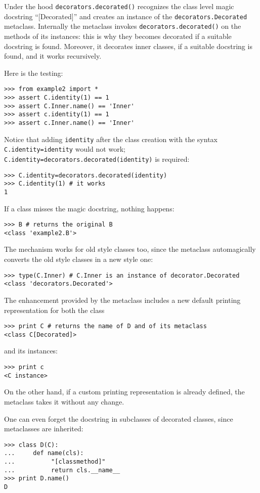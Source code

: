 \documentclass[11pt,english]{article}
\begin{document}
Under the hood \texttt{decorators.decorated()} recognizes the class level
magic docstring ``[Decorated]'' and creates an instance of the 
\texttt{decorators.Decorated} metaclass.
Internally the metaclass invokes \texttt{decorators.decorated()}
on the methods of its instances: this is why they becomes decorated
if a suitable docstring is found. Moreover, it decorates inner classes,
if a suitable docstring is found, and it works recursively.

Here is the testing:
\begin{verbatim}>>> from example2 import *
>>> assert C.identity(1) == 1
>>> assert C.Inner.name() == 'Inner'
>>> assert c.identity(1) == 1 
>>> assert c.Inner.name() == 'Inner' \end{verbatim}

Notice that adding \texttt{identity} after the class creation with the syntax 
\texttt{C.identity=identity} would not work; 
\texttt{C.identity=decorators.decorated(identity)} is required:
\begin{verbatim}>>> C.identity=decorators.decorated(identity)
>>> C.identity(1) # it works
1\end{verbatim}

If a class misses the magic docstring, nothing happens:
\begin{verbatim}>>> B # returns the original B
<class 'example2.B'>\end{verbatim}

The mechanism works for old style classes too,
since the metaclass automagically converts the old style classes in a 
new style one:
\begin{verbatim}>>> type(C.Inner) # C.Inner is an instance of decorator.Decorated
<class 'decorators.Decorated'>\end{verbatim}

The enhancement provided by the metaclass includes a new default 
printing representation for both the class
\begin{verbatim}>>> print C # returns the name of D and of its metaclass
<class C[Decorated]>\end{verbatim}

and its instances:
\begin{verbatim}>>> print c
<C instance>\end{verbatim}

On the other hand, if a custom printing representation is already
defined, the metaclass takes it without any change.

One can even forget the docstring in subclasses of decorated 
classes, since metaclasses are inherited:
\begin{verbatim}>>> class D(C):
...     def name(cls):
...          "[classmethod]"
...          return cls.__name__
>>> print D.name()
D\end{verbatim}
\end{document}
